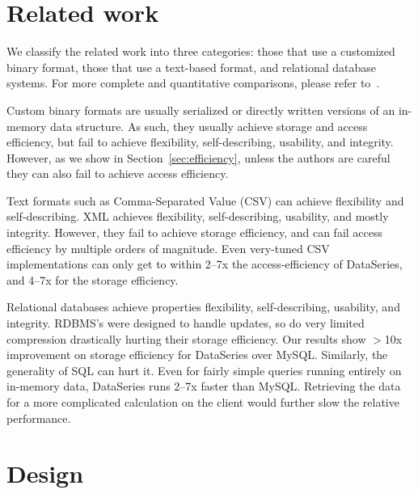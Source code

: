 \documentclass{acm_proc_article-sp}
\begin{document}
\section{Related work}\label{sec:related}

We classify the related work into three categories:
those that use a customized binary format, those that use a
text-based format, and relational database systems. 
For more complete and quantitative comparisons,
please refer to~\cite{DSTechnicalReportSnapshot}.

Custom binary formats are usually serialized or directly written
versions of an in-memory data structure.  As such, they usually
achieve storage 
and access efficiency, 
but fail to a\-chieve
flexibility, self-describing, usability, and integrity.
However, as we
show in Section~\ref{sec:efficiency}, 
unless the authors are careful they can also
fail to achieve access efficiency.

Text formats such as Comma-Separated Value (CSV) can
achieve flexibility and self-describing. XML achieves flexibility,
self-describing, usability, and mostly integrity.  However, they fail
to achieve storage efficiency, and can fail access efficiency by
multiple orders of magnitude.  Even very-tuned CSV implementations can
only get to within 2--7x the access-efficiency of DataSeries, and 4--7x
for the storage efficiency.

Relational databases achieve properties flexibility, self-de\-scrib\-ing,
usability, and integrity. RDBMS's were designed to handle updates, so
do very limited compression drastically hurting their storage
efficiency.  Our
results show $>$10x improvement on storage efficiency for DataSeries
over MySQL.
Similarly, the generality of SQL can hurt it.  Even for fairly simple
queries running entirely on in-memory data, DataSeries runs 2--7x
faster than MySQL. 
Retrieving the data for a more complicated
calculation on the client would further slow the relative performance.

\section{Design}\label{sec:design}
\end{document}
